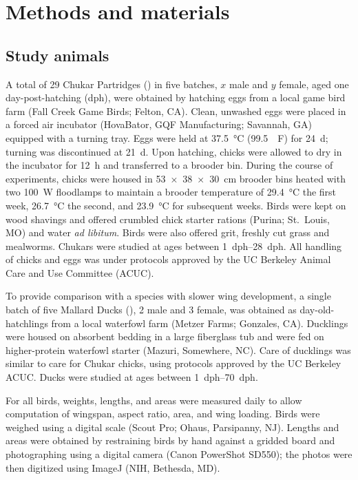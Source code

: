 \section{Methods and materials}
\label{sec:1methods}

\subsection{Study animals}
A total of 29 Chukar Partridges (\Alectorischukar) in five batches, $x$ male and $y$ female, aged one day-post-hatching (dph), were obtained by hatching eggs from a local game bird farm (Fall Creek Game Birds; Felton, CA).  Clean, unwashed eggs were placed in a forced air incubator (HovaBator, GQF Manufacturing; Savannah, GA) equipped with a turning tray.  Eggs were held at \SI{37.5}{\celsius} (\SI{99.5}{\SIUnitSymbolDegree F}) for \SI{24}{\day}; turning was discontinued at \SI{21}{\day}.  Upon hatching, chicks were allowed to dry in the incubator for \SI{12}{\hour} and transferred to a brooder bin.  During the course of experiments, chicks were housed in \SI{53x38x30}{\centi\meter} brooder bins heated with two \SI{100}{\watt} floodlamps to maintain a brooder temperature of \SI{29.4}{\celsius} the first week, \SI{26.7}{\celsius} the second, and \SI{23.9}{\celsius} for subsequent weeks.  Birds were kept on wood shavings and offered crumbled chick starter rations (Purina; St.\ Louis, MO) and water \emph{ad libitum}.  Birds were also offered grit, freshly cut grass and mealworms. Chukars were studied at ages between \SIrange{1}{28}{dph}.  All handling of chicks and eggs was under protocols approved by the UC Berkeley Animal Care and Use Committee (ACUC).

To provide comparison with a species with slower wing development, a single batch of five Mallard Ducks (\Anasplatyrhynchos), 2 male and 3 female, was obtained as day-old-hatchlings from a local waterfowl farm (Metzer Farms; Gonzales, CA). Ducklings were housed on absorbent bedding in a large fiberglass tub and were fed on higher-protein waterfowl starter (Mazuri, Somewhere, NC).  Care of ducklings was similar to care for Chukar chicks, using protocols approved by the UC Berkeley ACUC.  Ducks were studied at ages between \SIrange{1}{70}{dph}.

For all birds, weights, lengths, and areas were measured daily to allow computation of wingspan, aspect ratio, area, and wing loading.  Birds were weighed using a digital scale (Scout Pro; Ohaus, Parsipanny, NJ).  Lengths and areas were obtained by restraining birds by hand against a gridded board and photographing using a digital camera (Canon PowerShot SD550); the photos were then digitized using ImageJ (NIH, Bethesda, MD). 

